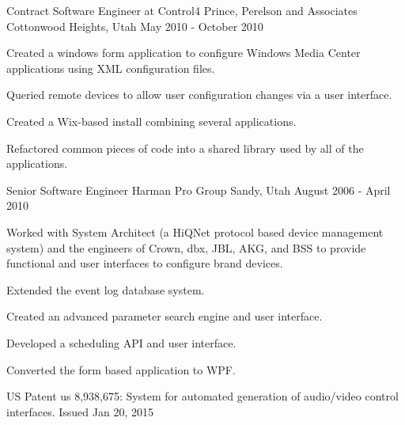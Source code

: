 \begin{cventries}
  \cventry
    {Contract Software Engineer at Control4} %
    {Prince, Perelson and Associates} %
    {Cottonwood Heights, Utah} %
    {May 2010 - October 2010} %
    {
      \begin{cvitems} %
      	\item {Created a windows \Csh{} form application to configure Windows Media Center applications using XML configuration files.}
      	\item {Queried remote devices to allow user configuration changes via a user interface.}
      	\item {Created a Wix-based install combining several applications.}
      	\item {Refactored common pieces of code into a shared library used by all of the applications.}
      \end{cvitems}
    }

  \cventry
    {Senior Software Engineer} %
    {Harman Pro Group} %
    {Sandy, Utah} %
    {August 2006 - April 2010} %
    {
      \begin{cvitems} %
      	\item {Worked with System Architect (a HiQNet protocol based device management system) and the engineers of Crown, dbx, JBL, AKG, and BSS to provide functional and user interfaces to configure brand devices.}
      	\item {Extended the event log database system.}
      	\item {Created an advanced parameter search engine and user interface.}
      	\item {Developed a scheduling API and user interface.}
      	\item {Converted the \Csh{} form based application to WPF.}
      	\item {US Patent us 8,938,675: System for automated generation of audio/video control interfaces. Issued Jan 20, 2015}
      \end{cvitems}
    }


\end{cventries}
